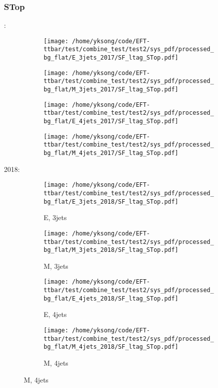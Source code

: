 \documentclass{beamer}
\begin{document}
\begin{frame}
\frametitle{STop}
\fontsize{5}{1}:
\begin{figure}
\centering
\begin{subfigure}[b]{0.24\textwidth}
\texttt{[image: /home/yksong/code/EFT-ttbar/test/combine\_test/test2/sys\_pdf/processed\_bg\_flat/E\_3jets\_2017/SF\_ltag\_STop.pdf]}
\end{subfigure}
\begin{subfigure}[b]{0.24\textwidth}
\texttt{[image: /home/yksong/code/EFT-ttbar/test/combine\_test/test2/sys\_pdf/processed\_bg\_flat/M\_3jets\_2017/SF\_ltag\_STop.pdf]}
\end{subfigure}
\begin{subfigure}[b]{0.24\textwidth}
\texttt{[image: /home/yksong/code/EFT-ttbar/test/combine\_test/test2/sys\_pdf/processed\_bg\_flat/E\_4jets\_2017/SF\_ltag\_STop.pdf]}
\end{subfigure}
\begin{subfigure}[b]{0.24\textwidth}
\texttt{[image: /home/yksong/code/EFT-ttbar/test/combine\_test/test2/sys\_pdf/processed\_bg\_flat/M\_4jets\_2017/SF\_ltag\_STop.pdf]}
\end{subfigure}
\end{figure}
2018:
\begin{figure}
\centering
\begin{subfigure}[b]{0.24\textwidth}
\texttt{[image: /home/yksong/code/EFT-ttbar/test/combine\_test/test2/sys\_pdf/processed\_bg\_flat/E\_3jets\_2018/SF\_ltag\_STop.pdf]}
\captionsetup{font=tiny}
\caption{E, 3jets}
\end{subfigure}
\begin{subfigure}[b]{0.24\textwidth}
\texttt{[image: /home/yksong/code/EFT-ttbar/test/combine\_test/test2/sys\_pdf/processed\_bg\_flat/M\_3jets\_2018/SF\_ltag\_STop.pdf]}
\captionsetup{font=tiny}
\caption{M, 3jets}
\end{subfigure}
\begin{subfigure}[b]{0.24\textwidth}
\texttt{[image: /home/yksong/code/EFT-ttbar/test/combine\_test/test2/sys\_pdf/processed\_bg\_flat/E\_4jets\_2018/SF\_ltag\_STop.pdf]}
\captionsetup{font=tiny}
\caption{E, 4jets}
\end{subfigure}
\begin{subfigure}[b]{0.24\textwidth}
\texttt{[image: /home/yksong/code/EFT-ttbar/test/combine\_test/test2/sys\_pdf/processed\_bg\_flat/M\_4jets\_2018/SF\_ltag\_STop.pdf]}
\captionsetup{font=tiny}
\caption{M, 4jets}
\end{subfigure}
\end{figure}
\end{frame}
\end{document}
